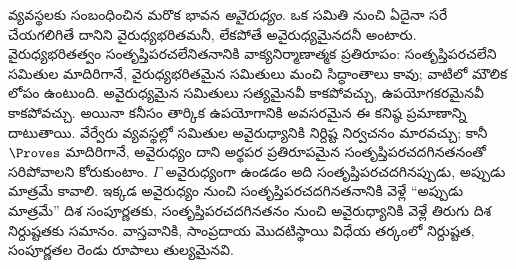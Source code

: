 \documentclass[../../../include/open-logic-section]{subfiles}
\begin{document}
 వ్యవస్థలకు సంబంధించిన మరొక భావన
\emph{అవైరుధ్యం}. ఒక  సమితి నుంచి ఏదైనా సరే
 చేయగలిగితే దానిని వైరుధ్యభరితమనీ, లేకపోతే అవైరుధ్యమైనదనీ
అంటారు. వైరుధ్యభరితత్వం సంతృప్తిపరచలేనితనానికి వాక్యనిర్మాణాత్మక
ప్రతిరూపం: సంతృప్తిపరచలేని సమితుల మాదిరిగానే, వైరుధ్యభరితమైన
 సమితులు మంచి సిద్ధాంతాలు కావు; వాటిలో మౌలిక లోపం
ఉంటుంది. అవైరుధ్యమైన  సమితులు సత్యమైనవీ కాకపోవచ్చు, ఉపయోగకరమైనవీ
కాకపోవచ్చు. అయినా కనీసం తార్కిక ఉపయోగానికి అవసరమైన ఈ కనిష్ఠ ప్రమాణాన్ని
దాటుతాయి. వేర్వేరు  వ్యవస్థల్లో  సమితుల
అవైరుధ్యానికి నిర్దిష్ట నిర్వచనం మారవచ్చు; కానీ $\Proves$ మాదిరిగానే,
అవైరుధ్యం దాని అర్థపర ప్రతిరూపమైన సంతృప్తిపరచదగినతనంతో సరిపోవాలని
కోరుకుంటాం. $\Gamma$ అవైరుధ్యంగా ఉండడం అది సంతృప్తిపరచదగినప్పుడు,
అప్పుడు మాత్రమే కావాలి. ఇక్కడ అవైరుధ్యం నుంచి
సంతృప్తిపరచదగినతనానికి వెళ్లే “అప్పుడు మాత్రమే” దిశ సంపూర్ణతకు,
సంతృప్తిపరచదగినతనం నుంచి అవైరుధ్యానికి వెళ్లే తిరుగు దిశ
నిర్దుష్టతకు సమానం. వాస్తవానికి, సాంప్రదాయ మొదటిస్థాయి విధేయ తర్కంలో
నిర్దుష్టత, సంపూర్ణతల రెండు రూపాలు తుల్యమైనవి.
\end{document}
